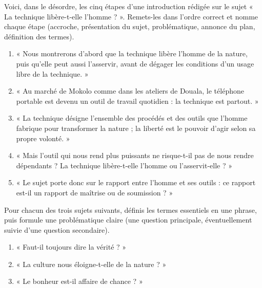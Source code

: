 \documentclass[11pt]{article}
\newcounter{popsec}
\newcounter{popsub}
\newcommand{\courssub}[1]{%
  \stepcounter{popsub}%
  \par\vspace{9pt}\noindent{\popxbold\fontsize{11.5}{13}\selectfont\color{popink}{\color{poporange}\thepopsec.\thepopsub}\hspace{6pt}#1}\par\nopagebreak\vspace{4pt}
}
\begin{document}
\begin{exercice}
Voici, dans le désordre, les cinq étapes d'une introduction rédigée sur le sujet « La technique libère-t-elle l'homme ? ». Remets-les dans l'ordre correct et nomme chaque étape (accroche, présentation du sujet, problématique, annonce du plan, définition des termes).
\begin{enumerate}
\item « Nous montrerons d'abord que la technique libère l'homme de la nature, puis qu'elle peut aussi l'asservir, avant de dégager les conditions d'un usage libre de la technique. »
\item « Au marché de Mokolo comme dans les ateliers de Douala, le téléphone portable est devenu un outil de travail quotidien : la technique est partout. »
\item « La technique désigne l'ensemble des procédés et des outils que l'homme fabrique pour transformer la nature ; la liberté est le pouvoir d'agir selon sa propre volonté. »
\item « Mais l'outil qui nous rend plus puissants ne risque-t-il pas de nous rendre dépendants ? La technique libère-t-elle l'homme ou l'asservit-elle ? »
\item « Le sujet porte donc sur le rapport entre l'homme et ses outils : ce rapport est-il un rapport de maîtrise ou de soumission ? »
\end{enumerate}
\end{exercice}

\courssub{Je m'entraîne}

\begin{exercice}
Pour chacun des trois sujets suivants, définis les termes essentiels en une phrase, puis formule une problématique claire (une question principale, éventuellement suivie d'une question secondaire).
\begin{enumerate}
\item « Faut-il toujours dire la vérité ? »
\item « La culture nous éloigne-t-elle de la nature ? »
\item « Le bonheur est-il affaire de chance ? »
\end{enumerate}
\end{exercice}
\end{document}
